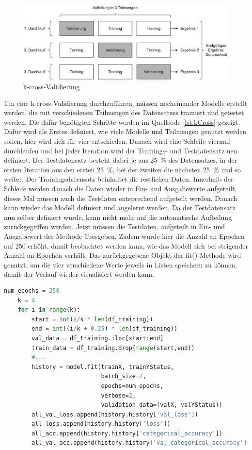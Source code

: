 \begin{figure}[H]
    \centering
    \includegraphics[width = \textwidth]{abbildungen/k_cross.pdf}
    \caption{k-cross-Validierung}
    \label{fig:kCross}
\end{figure}

Um eine k-cross-Validierung durchzuführen, müssen nacheinander Modelle erstellt werden, die mit verschiedenen Teilmengen des Datensatzes trainiert und getestet werden.
Die dafür benötigten Schritte werden im Quellcode \ref*{lst:kCross} gezeigt.
Dafür wird als Erstes definiert, wie viele Modelle und Teilmengen genutzt werden sollen, hier wird sich für vier entschieden. 
Danach wird eine Schleife viermal durchlaufen und bei jeder Iteration wird der Trainings- und Testdatensatz neu definiert. Der Testdatensatz besteht dabei 
je aus 25~\% des Datensatzes, in der ersten Iteration aus den ersten 25~\%, bei der zweiten die nächsten 25~\% und so weiter. Der Trainingsdatensatz beinhaltet die restlichen
Daten. Innerhalb der Schleife werden danach die Daten wieder in Ein- und Ausgabewerte aufgeteilt, dieses Mal müssen auch die Testdaten entsprechend aufgeteilt werden.
Danach kann wieder das Modell definiert und angelernt werden. Da der Testdatensatz nun selber definiert wurde, kann nicht mehr auf die automatische Aufteilung zurückgegriffen werden.
Jetzt müssen die Testdaten, aufgeteilt in Ein- und Ausgabewert der Methode übergeben. Zudem wurde hier die Anzahl an Epochen auf 250 erhöht, damit beobachtet werden kann,
wie das Modell sich bei steigender Anzahl an Epochen verhält. Das zurückgegebene Objekt der fit()-Methode wird genutzt, um die vier verschiedene Werte jeweils in Listen speichern 
zu können, damit der Verlauf wieder visualisiert werden kann.
\begin{lstlisting}[language = python, caption={Aufteilung des Datensatzes in Teilmengen},captionpos=b, label = lst:kCross, float, floatplacement=H]
    num_epochs = 250
    k = 4
    for i in range(k):
        start = int(i/k * len(df_training))
        end = int((i/k + 0.25) * len(df_training))
        val_data = df_training.iloc[start:end] 
        train_data = df_training.drop(range(start,end))
        #...
        history = model.fit(trainX, trainYStatus,
                            batch_size=2,
                            epochs=num_epochs,
                            verbose=2,
                            validation_data=(valX, valYStatus))
        all_val_loss.append(history.history['val_loss'])
        all_loss.append(history.history['loss'])
        all_acc.append(history.history['categorical_accuracy'])
        all_val_acc.append(history.history['val_categorical_accuracy'])
\end{lstlisting}

